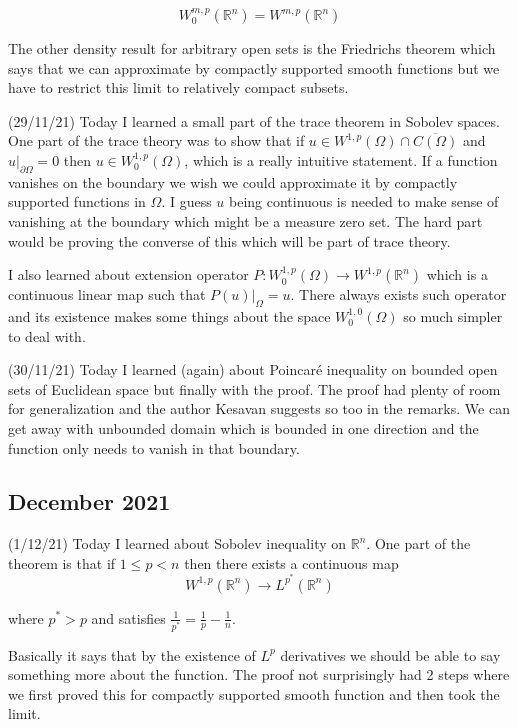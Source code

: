 \documentclass[12pt,a4paper]{article}
\newcommand{\R}{\mathbb{R}}
\begin{document}
   \[  W^{m,p}_0(\R^n) = W^{m,p}(\R^n)\]
   
The other density result for arbitrary open sets is the Friedrichs theorem which says that we can approximate by compactly supported smooth functions but we have to restrict this limit to relatively compact subsets.
   
(29/11/21) Today I learned a small part of the trace theorem in Sobolev spaces. One part of the trace theory was to show that if $u \in W^{1,p}(\Omega) \cap \overline{C(\Omega)}$ and $u|_{\partial \Omega} = 0$ then $u \in W^{1,p}_0(\Omega)$, which is a really intuitive statement. If a function vanishes on the boundary we wish we could approximate it by compactly supported functions in $\Omega$. I guess $u$ being continuous is needed to make sense of vanishing at the boundary which might be a measure zero set. The hard part would be proving the converse of this which will be part of trace theory.
   
I also learned about extension operator $P : W^{1,p}_0(\Omega) \to W^{1,p}(\R^n)$ which is a continuous linear map such that $P(u)|_{\Omega} = u$. There always exists such operator and its existence makes some things about the space $W^{1,0}_0(\Omega)$ so much simpler to deal with.
   
(30/11/21) Today I learned (again) about Poincar\'{e} inequality on bounded open sets of Euclidean space but finally with the proof. The proof had plenty of room for generalization and the author Kesavan suggests so too in the remarks. We can get away with unbounded domain which is bounded in one direction and the function only needs to vanish in that boundary.
   
\subsection*{December 2021}
   
   
\quad (1/12/21) Today I learned about Sobolev inequality on $\R^n$. One part of the theorem is that if $1 \le p < n$ then there exists a continuous map 
   \[ W^{1,p}(\R^n) \to L^{p^*}(\R^n) \]
   
where $p^* > p$ and satisfies $\frac{1}{p^*} = \frac{1}{p} - \frac{1}{n}$.
   
Basically it says that by the existence of $L^p$ derivatives we should be able to say something more about the function. The proof not surprisingly had 2 steps where we first proved this for compactly supported smooth function and then took the limit.
   
\end{document}
